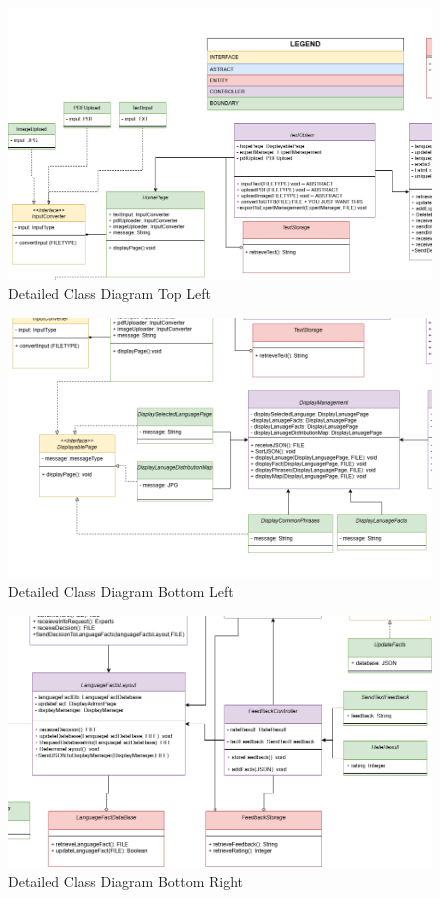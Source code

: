 \begin{figure}[H]
	\centering
	\includegraphics[width=\textwidth, height=\textheight, keepaspectratio]{Section4/images/LangufiyClassDiagramV6TL.png}
	\caption{Detailed Class Diagram Top Left}
	\label{DetailedClassDiagramQ2}
\end{figure}

\begin{figure}[H]
	\centering
	\includegraphics[width=\textwidth, height=\textheight, keepaspectratio]{Section4/images/LangufiyClassDiagramV6BL.png}
	\caption{Detailed Class Diagram Bottom Left}
	\label{DetailedClassDiagramQ3}
\end{figure}

\begin{figure}[H]
	\centering
	\includegraphics[width=\textwidth, height=\textheight, keepaspectratio]{Section4/images/LangufiyClassDiagramV7BR.png}
	\caption{Detailed Class Diagram Bottom Right}
	\label{DetailedClassDiagramQ4}
\end{figure}